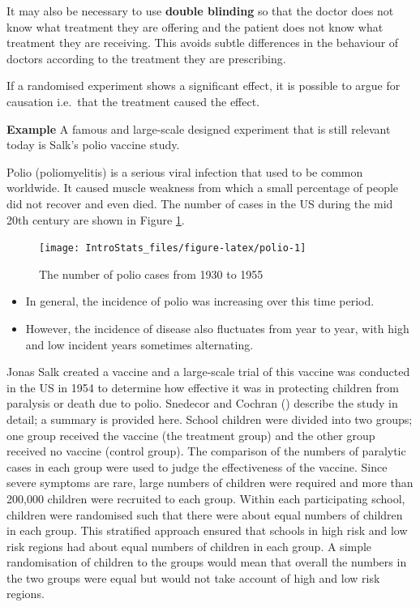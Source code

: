\documentclass[
  oneside]{krantz}
\providecommand{\tightlist}{%
  \setlength{\itemsep}{0pt}\setlength{\parskip}{0pt}}
\begin{document}
It may also be necessary to use \textbf{double blinding} so that the doctor does not know what treatment they are offering and the patient does not know what treatment they are receiving. This avoids subtle differences in the behaviour of doctors according to the treatment they are prescribing.

If a randomised experiment shows a significant effect, it is possible to argue for causation i.e.~that the treatment caused the effect.

\textbf{Example} A famous and large-scale designed experiment that is still relevant today is Salk's polio vaccine study.

Polio (poliomyelitis) is a serious viral infection that used to be common worldwide. It caused muscle weakness from which a small percentage of people did not recover and even died. The number of cases in the US during the mid 20th century are shown in Figure \ref{fig:polio}.

\begin{figure}[!htbp]

{\centering \texttt{[image: IntroStats\_files/figure-latex/polio-1]} 

}

\caption{The number of polio cases from 1930 to 1955}\label{fig:polio}
\end{figure}

\begin{itemize}
\tightlist
\item
  In general, the incidence of polio was increasing over this time period.
\item
  However, the incidence of disease also fluctuates from year to year, with high and low incident years sometimes alternating.
\end{itemize}

Jonas Salk created a vaccine and a large-scale trial of this vaccine was conducted in the US in 1954 to determine how effective it was in protecting children from paralysis or death due to polio. Snedecor and Cochran (\citeyearpar{Snedecor&Cochran1980}) describe the study in detail; a summary is provided here. School children were divided into two groups; one group received the vaccine (the treatment group) and the other group received no vaccine (control group). The comparison of the numbers of paralytic cases in each group were used to judge the effectiveness of the vaccine. Since severe symptoms are rare, large numbers of children were required and more than 200,000 children were recruited to each group. Within each participating school, children were randomised such that there were about equal numbers of children in each group. This stratified approach ensured that schools in high risk and low risk regions had about equal numbers of children in each group. A simple randomisation of children to the groups would mean that overall the numbers in the two groups were equal but would not take account of high and low risk regions.
\end{document}
